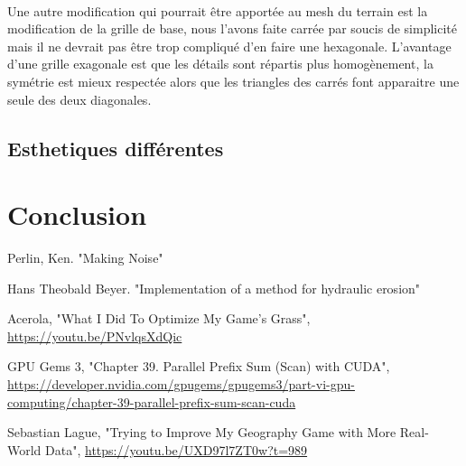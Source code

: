 \documentclass[11pt]{article} %
\begin{document}
\paragraph{}
Une autre modification qui pourrait être apportée au mesh du terrain est la modification de la grille de base, nous l'avons faite carrée par soucis de simplicité mais il ne devrait pas être trop compliqué d'en faire une hexagonale. L'avantage d'une grille exagonale est que les détails sont répartis plus homogènement, la symétrie est mieux respectée alors que les triangles des carrés font apparaitre une seule des deux diagonales.

\subsection{Esthetiques différentes}



\section{Conclusion}


\begin{thebibliography}{9}
Perlin, Ken. "Making Noise"

Hans Theobald Beyer. "Implementation of a method for hydraulic erosion"

Acerola, "What I Did To Optimize My Game's Grass", \url{https://youtu.be/PNvlqsXdQic}

GPU Gems 3, "Chapter 39. Parallel Prefix Sum (Scan) with CUDA", \url{https://developer.nvidia.com/gpugems/gpugems3/part-vi-gpu-computing/chapter-39-parallel-prefix-sum-scan-cuda}

Sebastian Lague, "Trying to Improve My Geography Game with More Real-World Data", \url{https://youtu.be/UXD97l7ZT0w?t=989}
\end{thebibliography}

\listoffigures
\end{document}
